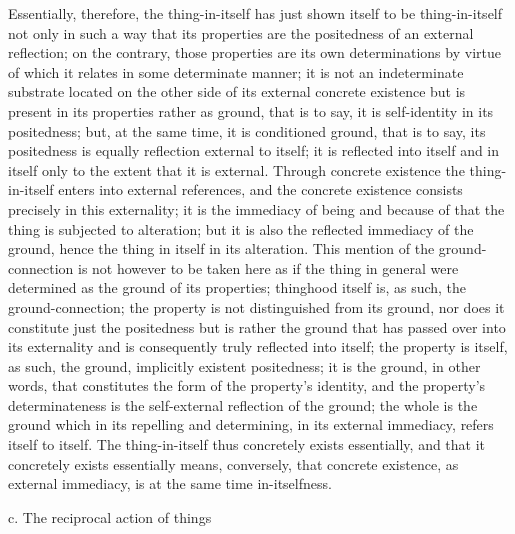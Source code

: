 Essentially, therefore, the thing-in-itself has
just shown itself to be thing-in-itself
not only in such a way that its properties are
the positedness of an external reflection;
on the contrary, those properties are its own determinations
by virtue of which it relates in some determinate manner;
it is not an indeterminate substrate located on
the other side of its external concrete existence
but is present in its properties rather as ground,
that is to say, it is self-identity in its positedness;
but, at the same time, it is conditioned ground,
that is to say, its positedness is
equally reflection external to itself;
it is reflected into itself and in itself only to
the extent that it is external.
Through concrete existence the thing-in-itself
enters into external references,
and the concrete existence consists
precisely in this externality;
it is the immediacy of being
and because of that the thing is
subjected to alteration;
but it is also the reflected immediacy of the ground,
hence the thing in itself in its alteration.
This mention of the ground-connection is
not however to be taken here as if
the thing in general were determined
as the ground of its properties;
thinghood itself is, as such, the ground-connection;
the property is not distinguished from its ground,
nor does it constitute just the positedness
but is rather the ground that has
passed over into its externality
and is consequently truly reflected into itself;
the property is itself, as such,
the ground, implicitly existent positedness;
it is the ground, in other words,
that constitutes the form of the property's identity,
and the property's determinateness is
the self-external reflection of the ground;
the whole is the ground which in its repelling and determining,
in its external immediacy, refers itself to itself.
The thing-in-itself thus concretely exists essentially,
and that it concretely exists essentially means,
conversely, that concrete existence, as external immediacy,
is at the same time in-itselfness.

c. The reciprocal action of things

